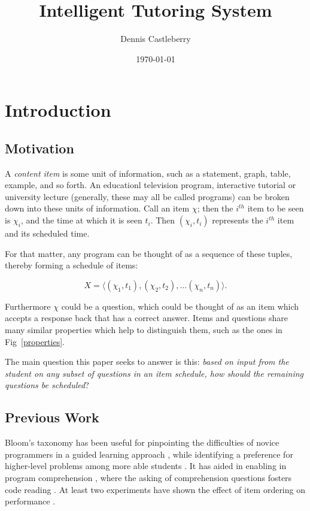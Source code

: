 \documentclass{article}
\title{Intelligent Tutoring System}
\author{Dennis Castleberry}
\date{\today}
\begin{document}
\maketitle


\setlength{\parindent}{0pt}
\setlength{\parskip}{4pt}

\section{Introduction}

\subsection{Motivation}

A \emph{content item} is some unit of information, such as a statement, graph,
table, example, and so forth.  An educationl television program, interactive
tutorial or university lecture (generally, these may all be called programs)
can be broken down into these units of information.  Call an item $\chi$; then
the $i^{th}$ item to be seen is $\chi_i$, and the time at which it is seen
$t_i$.  Then $(\chi_i, t_i)$ represents the $i^{th}$ item and its scheduled
time.  

For that matter, any program can be thought of as a sequence of these tuples,
thereby forming a schedule of items: 

 \begin{equation}
   X = \langle (\chi_1, t_1), (\chi_2, t_2), \ldots (\chi_n, t_n) \rangle.
 \end{equation}
 \vspace{2pt}

Furthermore $\chi$ could be a question, which could be thought of as an item
which accepts a response back that has a correct answer.  Items and questions
share many similar properties which help to distinguish them, such as the
ones in Fig~\ref{properties}.

The main question this paper seeks to answer is this: \emph{based on input from
the student on any subset of questions in an item schedule, how should the
remaining questions be scheduled}?

\subsection{Previous Work}

Bloom's taxonomy has been useful for pinpointing the difficulties of novice
programmers in a guided learning approach \cite{shuhidan2011}, while
identifying a preference for higher-level problems among more able students
\cite{bruyn2011} \cite{goel2004}.  It has aided in enabling in program
comprehension \cite{buckley2003}, where the asking of comprehension questions
fosters code reading \cite{losada2008}.  At least two experiments have shown
the effect of item ordering on performance \cite{newman1988effect}
\cite{castleberry2016effect}.
\end{document}
